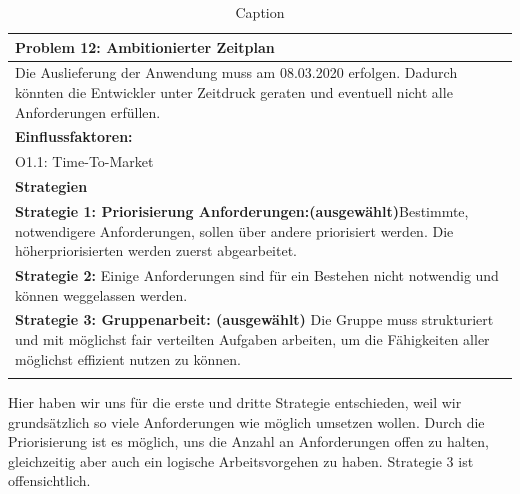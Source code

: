 \documentclass[enabledeprecatedfontcommands,fontsize=12pt,paper=a4,twoside]{scrartcl}
\begin{document}
\begin{table}[H]
    \centering
    \begin{tabular}{|p{15cm}|}
    \hline
          \textbf{Problem 12:} Ambitionierter Zeitplan
          \\ \hline
          Die Auslieferung der Anwendung muss am 08.03.2020 erfolgen. Dadurch könnten die Entwickler unter Zeitdruck geraten und eventuell nicht alle Anforderungen erfüllen.
          \\ \hline
          \textbf{Einflussfaktoren: } \\
          O1.1: Time-To-Market\\
          \hline
          \textbf{Strategien} \\ \hline

         \textbf{Strategie 1: Priorisierung Anforderungen:(ausgewählt)}Bestimmte, notwendigere Anforderungen, sollen über andere priorisiert werden. Die höherpriorisierten werden zuerst abgearbeitet. \\
          \textbf{Strategie 2:} Einige Anforderungen sind für ein Bestehen nicht notwendig und können weggelassen werden.\\
          \textbf{Strategie 3: Gruppenarbeit: (ausgewählt)} Die Gruppe muss strukturiert und mit möglichst fair verteilten Aufgaben arbeiten, um die Fähigkeiten aller möglichst effizient nutzen zu können. \\
          \\ \hline
    \end{tabular}
    \caption{Caption}
    \label{tab:my_label}
\end{table}
Hier haben wir uns für die erste und dritte Strategie entschieden, weil wir grundsätzlich so viele Anforderungen wie möglich umsetzen wollen. Durch die Priorisierung ist es möglich, uns die Anzahl an Anforderungen offen zu halten, gleichzeitig aber auch ein logische Arbeitsvorgehen zu haben. Strategie 3 ist offensichtlich. \\
\end{document}

